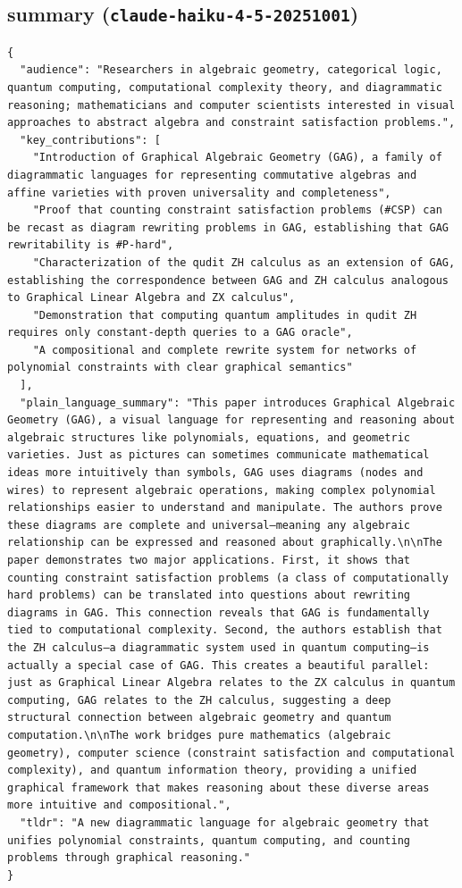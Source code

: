 \documentclass[11pt]{article}
\begin{document}
\subsection*{summary (\texttt{claude-haiku-4-5-20251001})}
\begin{verbatim}
{
  "audience": "Researchers in algebraic geometry, categorical logic, quantum computing, computational complexity theory, and diagrammatic reasoning; mathematicians and computer scientists interested in visual approaches to abstract algebra and constraint satisfaction problems.",
  "key_contributions": [
    "Introduction of Graphical Algebraic Geometry (GAG), a family of diagrammatic languages for representing commutative algebras and affine varieties with proven universality and completeness",
    "Proof that counting constraint satisfaction problems (#CSP) can be recast as diagram rewriting problems in GAG, establishing that GAG rewritability is #P-hard",
    "Characterization of the qudit ZH calculus as an extension of GAG, establishing the correspondence between GAG and ZH calculus analogous to Graphical Linear Algebra and ZX calculus",
    "Demonstration that computing quantum amplitudes in qudit ZH requires only constant-depth queries to a GAG oracle",
    "A compositional and complete rewrite system for networks of polynomial constraints with clear graphical semantics"
  ],
  "plain_language_summary": "This paper introduces Graphical Algebraic Geometry (GAG), a visual language for representing and reasoning about algebraic structures like polynomials, equations, and geometric varieties. Just as pictures can sometimes communicate mathematical ideas more intuitively than symbols, GAG uses diagrams (nodes and wires) to represent algebraic operations, making complex polynomial relationships easier to understand and manipulate. The authors prove these diagrams are complete and universal—meaning any algebraic relationship can be expressed and reasoned about graphically.\n\nThe paper demonstrates two major applications. First, it shows that counting constraint satisfaction problems (a class of computationally hard problems) can be translated into questions about rewriting diagrams in GAG. This connection reveals that GAG is fundamentally tied to computational complexity. Second, the authors establish that the ZH calculus—a diagrammatic system used in quantum computing—is actually a special case of GAG. This creates a beautiful parallel: just as Graphical Linear Algebra relates to the ZX calculus in quantum computing, GAG relates to the ZH calculus, suggesting a deep structural connection between algebraic geometry and quantum computation.\n\nThe work bridges pure mathematics (algebraic geometry), computer science (constraint satisfaction and computational complexity), and quantum information theory, providing a unified graphical framework that makes reasoning about these diverse areas more intuitive and compositional.",
  "tldr": "A new diagrammatic language for algebraic geometry that unifies polynomial constraints, quantum computing, and counting problems through graphical reasoning."
}
\end{verbatim}
\end{document}
